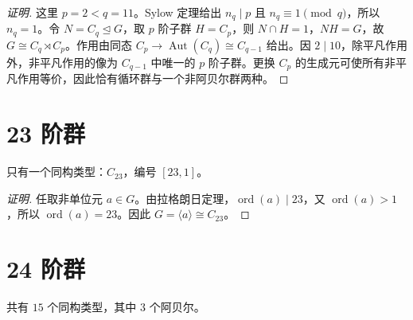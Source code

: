 \documentclass[UTF8,fontset=fandol,11pt,a4paper]{ctexart}
\newcommand{\Aut}{\operatorname{Aut}}\newcommand{\GL}{\operatorname{GL}}\newcommand{\ord}{\operatorname{ord}}\newcommand{\Z}{\mathrm Z}
\begin{document}
\begin{proof}[证明]
这里 $p=2<q=11$。Sylow 定理给出 $n_q\mid p$ 且 $n_q\equiv1\pmod q$，所以 $n_q=1$。令 $N=C_q\trianglelefteq G$，取 $p$ 阶子群 $H=C_p$，则 $N\cap H=1$，$NH=G$，故 $G\cong C_q\rtimes C_p$。作用由同态 $C_p\to\Aut(C_q)\cong C_{q-1}$ 给出。因 $2\mid 10$，除平凡作用外，非平凡作用的像为 $C_{q-1}$ 中唯一的 $p$ 阶子群。更换 $C_p$ 的生成元可使所有非平凡作用等价，因此恰有循环群与一个非阿贝尔群两种。
\end{proof}

\section*{23 阶群}\label{order:23}

只有一个同构类型：$C_{23}$，编号 $[23,1]$。

\begin{proof}[证明]
任取非单位元 $a\in G$。由拉格朗日定理，$\ord(a)\mid 23$，又 $\ord(a)>1$，所以 $\ord(a)=23$。因此 $G=\langle a\rangle\cong C_{23}$。
\end{proof}

\section*{24 阶群}\label{order:24}

共有 $15$ 个同构类型，其中 $3$ 个阿贝尔。

\begingroup\small\setlength{\tabcolsep}{3pt}\renewcommand{\arraystretch}{1.12}
\end{document}

